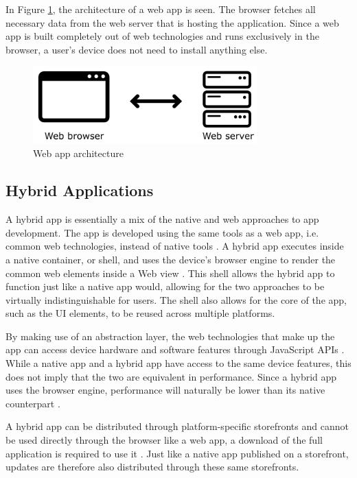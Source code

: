 \documentclass[a4paper,12pt]{article}
\begin{document}
In Figure \ref{fig:webapp}, the architecture of a web app is seen. The browser fetches all necessary data from the web server that is hosting the application. Since a web app is built completely out of web technologies and runs exclusively in the browser, a user’s device does not need to install anything else.

\begin{figure}[h]%
	\centering
	\includegraphics[height=3cm]{img/Other/struct_webapp.png}
	\caption{Web app architecture}%
	\label{fig:webapp}%
\end{figure}

\subsection{Hybrid Applications}
\label{Theory_hybridApps}
A hybrid app is essentially a mix of the native and web approaches to app development. The app is developed using the same tools as a web app, i.e. common web technologies, instead of native tools \cite{mobile_web_apps_2013}. A hybrid app executes inside a native container, or shell, and uses the device’s browser engine to render the common web elements inside a Web view \cite{crossplatform_2012}. This shell allows the hybrid app to function just like a native app would, allowing for the two approaches to be virtually indistinguishable for users. The shell also allows for the core of the app, such as the UI elements, to be reused across multiple platforms.

By making use of an abstraction layer, the web technologies that make up the app can access device hardware and software features through JavaScript APIs \cite{crossplatform_2012}. While a native app and a hybrid app have access to the same device features, this does not imply that the two are equivalent in performance. Since a hybrid app uses the browser engine, performance will naturally be lower than its native counterpart \cite{crossplatform_taxonomy, crossplatform_2012}.

A hybrid app can be distributed through platform-specific storefronts and cannot be used directly through the browser like a web app, a download of the full application is required to use it \cite{crossplatform_2012, mobile_web_apps_2013}. Just like a native app published on a storefront, updates are therefore also distributed through these same storefronts.
\end{document}
